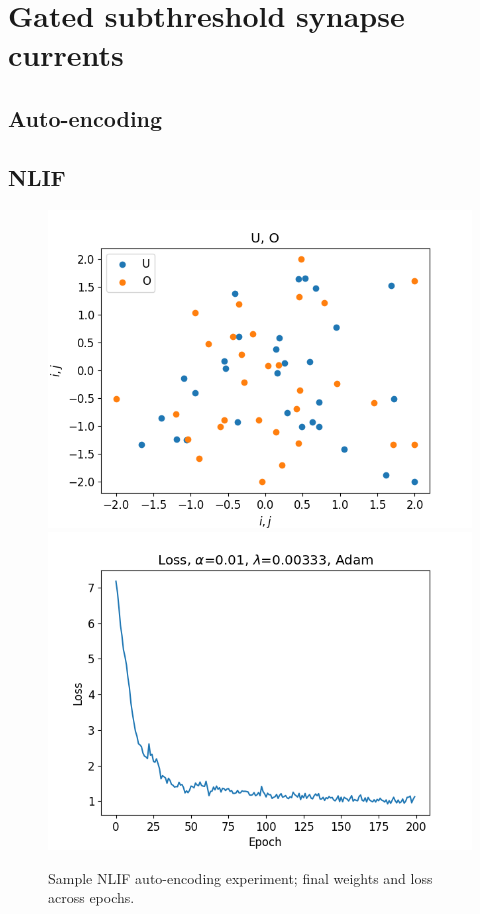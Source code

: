 \documentclass[mphil,deptreport,ianc]{infthesis} %
\begin{document}
\section*{Gated subthreshold synapse currents}

\subsection*{Auto-encoding}

\subsection*{NLIF}

\begin{figure}[!h]
    \centering
    \includegraphics[width=0.49\columnwidth]{figures/Supplementary/gating/NLIF/AutoEncoding/01-04_16-42-46-568/_weights_O_U.png}
    \includegraphics[width=0.49\columnwidth]{figures/Supplementary/gating/NLIF/AutoEncoding/01-04_16-42-46-568/plot_loss_test_mt_NLIF_et_AutoEncoding_N_30_titers_200.png}
    \caption{Sample NLIF auto-encoding experiment; final weights and loss across epochs.}
    \label{fig:NLIF_AE_1_w_loss}
\end{figure}
\end{document}

